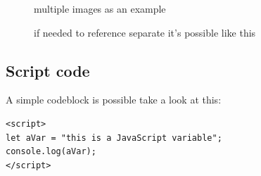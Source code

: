 \documentclass[10pt]{article}
\begin{document}
\begin{figure}[H]
	\centering
	\caption{multiple images as an example}
	\caption{if needed to reference separate it's possible like this}
\end{figure}

\subsection{Script code}
A simple codeblock is possible take a look at this:
\begin{lstlisting}
<script>
let aVar = "this is a JavaScript variable";
console.log(aVar);
</script>
\end{lstlisting}
\end{document}
